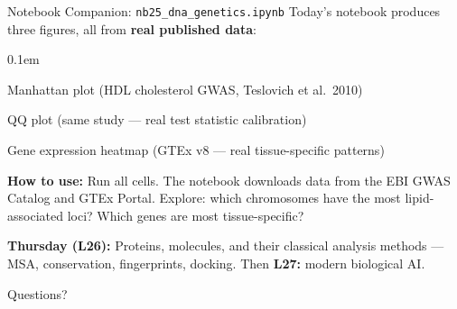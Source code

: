 \documentclass[aspectratio=169,10pt]{beamer}
\begin{document}
\begin{frame}{Notebook Companion: \texttt{nb25\_dna\_genetics.ipynb}}
{\small Today's notebook produces three figures, all from \textbf{real published data}:}
\begin{enumerate}\itemsep0.1em
    {\small
    \item Manhattan plot (HDL cholesterol GWAS, Teslovich et al.\ 2010)
    \item QQ plot (same study --- real test statistic calibration)
    \item Gene expression heatmap (GTEx v8 --- real tissue-specific patterns)
    }
\end{enumerate}

{\small \textbf{How to use:} Run all cells. The notebook downloads data from the EBI GWAS Catalog and GTEx Portal. Explore: which chromosomes have the most lipid-associated loci? Which genes are most tissue-specific?}

{\footnotesize \textbf{Thursday (L26):} Proteins, molecules, and their classical analysis methods --- MSA, conservation, fingerprints, docking. Then \textbf{L27:} modern biological AI.}
\end{frame}

\begin{frame}[standout]
    Questions?
\end{frame}


\appendix
\end{document}

